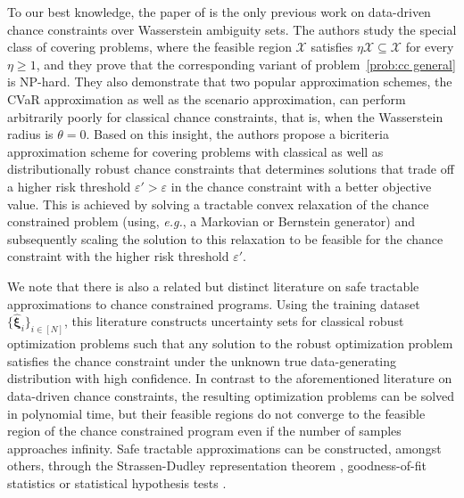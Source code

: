 \documentclass[nonblindrev]{informs2017}
\newcommand{\bmh}[1]{\hat{\bm{#1}}}
\newcommand{\1}[1]{\mathds{1}{\left(#1\right)}}
\begin{document}
To our best knowledge, the paper of \cite{xie2018bicriteria} is the only previous work on data-driven chance constraints over Wasserstein ambiguity sets. The authors study the special class of covering problems, where the feasible region $\mathcal{X}$ satisfies $\eta \mathcal{X} \subseteq \mathcal{X}$ for every $\eta \geq 1$, and they prove that the corresponding variant of problem~\eqref{prob:cc general} is NP-hard. They also demonstrate that two popular approximation schemes, the CVaR approximation as well as the scenario approximation, can perform arbitrarily poorly for classical chance constraints, that is, when the Wasserstein radius is $\theta = 0$. Based on this insight, the authors propose a bicriteria approximation scheme for covering problems with classical as well as distributionally robust chance constraints that determines solutions that trade off a higher risk threshold $\varepsilon' > \varepsilon$ in the chance constraint with a better objective value. This is achieved by solving a tractable convex relaxation of the chance constrained problem (using, \emph{e.g.}, a Markovian or Bernstein generator) and subsequently scaling the solution to this relaxation to be feasible for the chance constraint with the higher risk threshold $\varepsilon'$.

We note that there is also a related but distinct literature on safe tractable approximations to chance constrained programs. Using the training dataset $\{\bmh{\xi}_i\}_{i \in [N]}$, this literature constructs uncertainty sets for classical robust optimization problems such that any solution to the robust optimization problem satisfies the chance constraint under the unknown true data-generating distribution with high confidence. In contrast to the aforementioned literature on data-driven chance constraints, the resulting optimization problems can be solved in polynomial time, but their feasible regions do not converge to the feasible region of the chance constrained program even if the number of samples approaches infinity. Safe tractable approximations can be constructed, amongst others, through the Strassen-Dudley representation theorem \citep{erdougan2006ambiguous}, goodness-of-fit statistics \citep{yanikouglu2012safe} or statistical hypothesis tests \citep{bertsimas2018data}.
\end{document}
